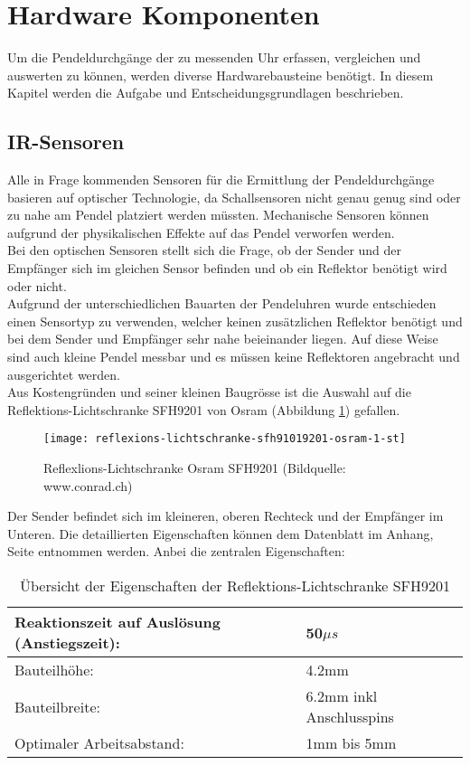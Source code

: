 \section{Hardware Komponenten}
Um die Pendeldurchgänge der zu messenden Uhr erfassen, vergleichen und auswerten zu können, werden diverse Hardwarebausteine benötigt. In diesem Kapitel werden die Aufgabe und Entscheidungsgrundlagen beschrieben.
%
%
\subsection{IR-Sensoren}
\label{cap:sensoren}
	Alle in Frage kommenden Sensoren für die Ermittlung der Pendeldurchgänge basieren auf optischer Technologie, da Schallsensoren nicht genau genug sind oder zu nahe am Pendel platziert werden müssten. Mechanische Sensoren können aufgrund der physikalischen Effekte auf das Pendel verworfen werden.\\
	 Bei den optischen Sensoren stellt sich die Frage, ob der Sender und der Empfänger sich im gleichen Sensor befinden und ob ein Reflektor benötigt wird oder nicht.\\
	Aufgrund der unterschiedlichen Bauarten der Pendeluhren wurde entschieden einen Sensortyp zu verwenden, welcher keinen zusätzlichen Reflektor benötigt und bei dem Sender und Empfänger sehr nahe beieinander liegen. Auf diese Weise sind auch kleine Pendel messbar und es müssen keine Reflektoren angebracht und ausgerichtet werden.\\
	Aus Kostengründen und seiner kleinen Baugrösse ist die Auswahl auf die Reflektions-Lichtschranke SFH9201 von Osram (Abbildung \ref{fig:SFH9201}) gefallen.
	\begin{figure}[H]
        \centering
        \texttt{[image: reflexions-lichtschranke-sfh91019201-osram-1-st]}
        \caption{Reflexlions-Lichtschranke Osram SFH9201 (Bildquelle: www.conrad.ch)}
        \label{fig:SFH9201}
    \end{figure}
	\noindent Der Sender befindet sich im kleineren, oberen Rechteck und der Empfänger im Unteren. Die detaillierten Eigenschaften können dem Datenblatt im Anhang, Seite \pageref{app:SFH9201} entnommen werden. Anbei die zentralen Eigenschaften:
	\begin{table}[H]
		\begin{tabular}{|p{11cm}|p{4cm}|}\hline
			Reaktionszeit auf Auslösung (Anstiegszeit): & 50$\mu{s}$ \\ \hline
			Bauteilhöhe:								& 4.2mm\\ \hline
			Bauteilbreite:								& 6.2mm inkl Anschlusspins\\ \hline
			Optimaler Arbeitsabstand:					& 1mm bis 5mm \\ \hline
		\end{tabular}
		\caption{Übersicht der Eigenschaften der Reflektions-Lichtschranke SFH9201}
		\label{tab:SFH9201}
	\end{table}
%
%	
\clearpage

